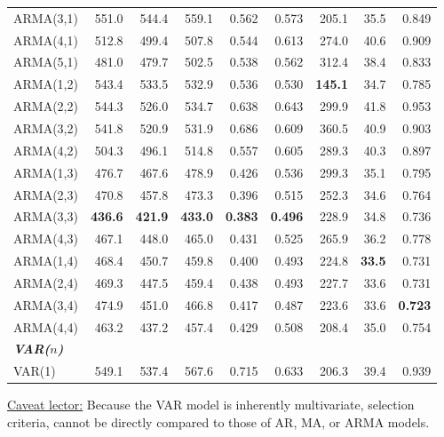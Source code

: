 \documentclass{Configuration_Files/PoliMi3i_thesis}
\begin{document}
\begin{table}[H]
\begin{tabular}{@{}lrrrrrrrr@{}}
    ARMA(3,1) & 551.0 & 544.4 & 559.1 & 0.562 & 0.573 & 205.1 & 35.5 & 0.849 \\
    ARMA(4,1) & 512.8 & 499.4 & 507.8 & 0.544 & 0.613 & 274.0 & 40.6 & 0.909 \\
    ARMA(5,1) & 481.0 & 479.7 & 502.5 & 0.538 & 0.562 & 312.4 & 38.4 & 0.833 \\
    ARMA(1,2) & 543.4 & 533.5 & 532.9 & 0.536 & 0.530 & \textbf{145.1} & 34.7 & 0.785 \\
    ARMA(2,2) & 544.3 & 526.0 & 534.7 & 0.638 & 0.643 & 299.9 & 41.8 & 0.953 \\
    ARMA(3,2) & 541.8 & 520.9 & 531.9 & 0.686 & 0.609 & 360.5 & 40.9 & 0.903 \\
    ARMA(4,2) & 504.3 & 496.1 & 514.8 & 0.557 & 0.605 & 289.3 & 40.3 & 0.897 \\
    ARMA(1,3) & 476.7 & 467.6 & 478.9 & 0.426 & 0.536 & 299.3 & 35.1 & 0.795 \\
    ARMA(2,3) & 470.8 & 457.8 & 473.3 & 0.396 & 0.515 & 252.3 & 34.6 & 0.764 \\
    \rowcolor{gray!20}
    ARMA(3,3) & \textbf{436.6} & \textbf{421.9} & \textbf{433.0} 
           & \textbf{0.383} & \textbf{0.496} & 228.9 & 34.8 & 0.736 \\
    ARMA(4,3) & 467.1 & 448.0 & 465.0 & 0.431 & 0.525 & 265.9 & 36.2 & 0.778 \\
    ARMA(1,4) & 468.4 & 450.7 & 459.8 & 0.400 & 0.493 & 224.8 & \textbf{33.5} & 0.731 \\
    ARMA(2,4) & 469.3 & 447.5 & 459.4 & 0.438 & 0.493 & 227.7 & 33.6 & 0.731 \\
    ARMA(3,4) & 474.9 & 451.0 & 466.8 & 0.417 & 0.487 & 223.6 & 33.6 & \textbf{0.723} \\
    ARMA(4,4) & 463.2 & 437.2 & 457.4 & 0.429 & 0.508 & 208.4  & 35.0 & 0.754 \\
    \midrule
    \midrule
\textbf{\textit{VAR($n$)}}\\    VAR(1)
      & 549.1 & 537.4 & 567.6 & 0.715 & 0.633 & 206.3 & 39.4 & 0.939 \\
    \bottomrule
  \end{tabular}
\end{table}
\label{CPI_TABLE}

\vspace{1.5em}
\underline{Caveat lector:} Because the VAR model is inherently multivariate, selection criteria, cannot be directly compared to those of AR, MA, or ARMA models. 
\end{document}
